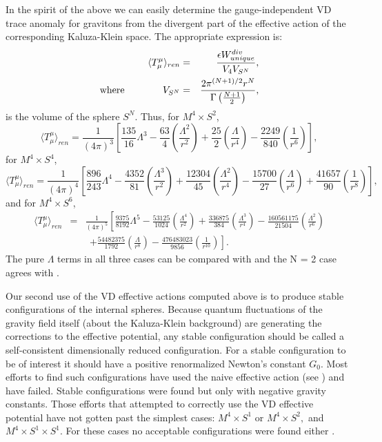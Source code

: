 \documentclass[a4paper,aps,preprint,groupedaddress,showpacs]{revtex4}
\begin{document}
In the spirit of the above we can easily determine the gauge-independent VD trace
anomaly for gravitons from the divergent part of the effective action of
the corresponding Kaluza-Klein
space. The appropriate expression is:
\begin{eqnarray}
\langle T^{\mu}_{\mu}\rangle_{ren}
&=&\frac{\epsilon W^{div}_{unique}}{V_{4}V_{S^{N}}},
\nonumber\\
{\rm where \hskip .5 in}\  V_{S^{N}}&=& 
{2\pi^{(N+1)/2}r^{N}\over\Gamma\left(\frac{N+1}{2}\right) },
\label{VSN}
\end{eqnarray}
is the volume of the sphere $S^N$.
Thus, for $M^{4}\times S^{2}$, 
\begin{equation}
\langle T^{\mu}_{\mu}\rangle_{ren}=
\frac{1}{(4\pi)^{3}}\left[
\frac{135}{16}\Lambda^{3}-
\frac{63}{4}\left(\frac{\Lambda^{2}}{r^{2}}\right)+
\frac{25}{2}\left(\frac{\Lambda}{r^{4}}\right)-
\frac{2249}{840}\left(\frac{1}{r^{6}}\right)\right],
\end{equation}
for $M^{4}\times S^{4}$,
\begin{equation}
\langle T^{\mu}_{\mu}\rangle_{ren}=
\frac{1}{(4\pi)^{4}}\left[
\frac{896}{243}\Lambda^{4}-
\frac{4352}{81}\left(\frac{\Lambda^{3}}{r^{2}}\right)+
\frac{12304}{45}\left(\frac{\Lambda^{2}}{r^{4}}\right)-
\frac{15700}{27}\left(\frac{\Lambda}{r^{6}}\right)+
\frac{41657}{90}\left(\frac{1}{r^{8}}\right)\right],
\end{equation}
and for $M^{4}\times S^{6}$,
\begin{eqnarray}
\langle T^{\mu}_{\mu}\rangle_{ren}&=&
\frac{1}{(4\pi)^{5}}\left[
\frac{9375}{8192}\Lambda^{5}-
\frac{53125}{1024}\left(\frac{\Lambda^{4}}{r^{2}}\right)+
\frac{336875}{384}\left(\frac{\Lambda^{3}}{r^{4}}\right)-
\frac{160561175}{21504}\left(\frac{\Lambda^{2}}{r^{6}}\right)\right.
\nonumber\\
&&\ \ \left.
+\frac{54482375}{1792}\left(\frac{\Lambda}{r^{8}}\right)-
\frac{476483023}{9856}\left(\frac{1}{r^{10}}\right)\right].
\end{eqnarray}
The pure $\Lambda$ terms in all three cases can be compared with 
\cite{CK3} and the N = 2 case agrees with \cite{CK1}.

Our second use of the VD effective actions computed above is to produce stable 
configurations of the internal spheres. Because quantum fluctuations of the gravity field itself (about the Kaluza-Klein 
background) are generating the corrections to the effective potential, 
any stable configuration should
be called a self-consistent dimensionally reduced configuration. For a stable
configuration to
be of interest it should have a  positive renormalized Newton's constant $G_0$. 
Most efforts to find such configurations have 
used the naive effective action (see \cite{RDS,CM,M}) and have failed. 
Stable configurations 
were found but
only with  negative gravity constants. Those efforts that attempted
to correctly use  the VD
effective potential have not gotten past the simplest cases: $M^{4}\times S^{1}$ or 
$M^{4}\times S^{2},$ and $M^{4}\times S^{1}\times S^{1}$.  
For these cases no acceptable configurations were 
found either \cite{BO,HKLT,BLO,SDOb,BKLM,BKO,SDO} . 
\end{document}
